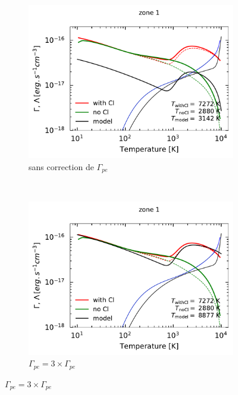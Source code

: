 \begin{figure}[!h]
    \centering
    \begin{subfigure}[t]{0.49\textwidth} %
        \centering \includegraphics[trim = {0 0 0 1cm },clip,width=1\textwidth]{figure/Cl/modelPE/GCcomp_Cl_1_1.pdf}
        \caption{sans correction de $\Gamma_{pe}$}
    \label{fig:Cl:modelPE:GC}
    \end{subfigure}
    ~ 
    \begin{subfigure}[t]{0.49\textwidth}
        \centering \includegraphics[trim = {0 0 0 1cm },clip,width=1\textwidth]{figure/Cl/modelPE/GCcomp_Cl_1_3.pdf}
        \caption{$\Gamma_{pe} =  3 \times \Gamma_{pe}$}
    \label{fig:Cl:modelPE:GC3}

\end{subfigure}
\end{figure}
